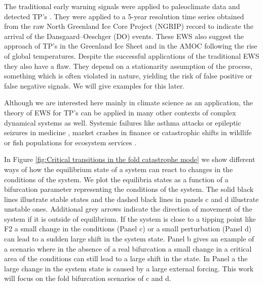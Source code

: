 \documentclass[%
thesis=student,%
coverpage=false,%
titlepage=false,%
headmarks=true, %
english,%
font=libertine, %
math=newpxtx, %
BCOR=5mm,%
coverBCOR=11mm%
]{tumbook}
\begin{document}
The traditional early warning signals were applied to paleoclimate data and detected TP's \cite{Boers:2018}. They were applied to a 5-year resolution time series obtained from the raw North Greenland Ice Core Project (NGRIP) record to indicate the arrival of the Dansgaard–Oeschger (DO) events. These EWS also suggest the approach of TP's in the Greenland Ice Sheet \cite{Boers:2021} and in the AMOC  \cite{Boers:2021b} following the rise of global temperatures. Despite the successful applications of the traditional EWS they also have a flaw. They depend on a stationarity assumption of the process, something which is often violated in nature, yielding the risk of false positive or false negative signals. We will give examples for this later. 

Although we are interested here mainly in climate science as an application, the theory of EWS for TP's can be applied in many other contexts of complex dynamical systems as well. Systemic failures like asthma attacks \cite{Venegas:2005} or epileptic seizures in medicine \cite{Litt:2001, McSharry:2003}, market crashes in finance \cite{Kambhu:2007,May:2008} or catastrophic shifts in wildlife or fish populations for ecosystem services \cite{Scheffer:2001, MillenniumEcosystemAssessment:2005}. 

In Figure \ref{fig:Critical transitions in the fold catastrophe mode} we show different ways of how the equilibrium state of a system can react to changes in the conditions of the system. We plot the equilibria states as a function of a bifurcation parameter representing the conditions of the system. The solid black lines illustrate stable states and the dashed black lines in panels c and d illustrate unstable ones. Additional grey arrows indicate the direction of movement of the system if it is outside of equilibrium. If the system is close to a tipping point like F2 a small change in the conditions (Panel c) or a small perturbation (Panel d) can lead to a sudden large shift in the system state. Panel b gives an example of a scenario where in the absence of a real bifurcation a small change in a critical area of the conditions can still lead to a large shift in the state. In Panel a the large change in the system state is caused by a large external forcing. This work will focus on the fold bifurcation scenarios of c and d.

\end{document}
